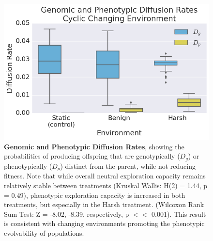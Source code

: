 \documentclass[PhD]{msu-thesis}
\begin{document}
	\begin{figure}[!h] %
	\includegraphics[width=0.75\columnwidth]{figures/CE/CCE_D_g_D_p__box.png}
	\caption{\textbf{Genomic and Phenotypic Diffusion Rates}, showing the probabilities of producing offspring that are genotypically ($D_g$) or phenotypically ($D_p$) distinct from the parent, while not reducing fitness.
	Note that while overall neutral exploration capacity remains relatively stable between treatments (Kruskal Wallis: H(2) = 1.44, p = 0.49), phenotypic exploration capacity is increased in both treatments, but especially in the Harsh treatment. (Wilcoxon Rank Sum Test: Z = -8.02, -8.39, respectively, p $<<$ 0.001). This result is consistent with changing environments promoting the phenotypic evolvability of populations.
	}\label{fig:CCE_diffusion_rate}
	\end{figure}
\end{document}
